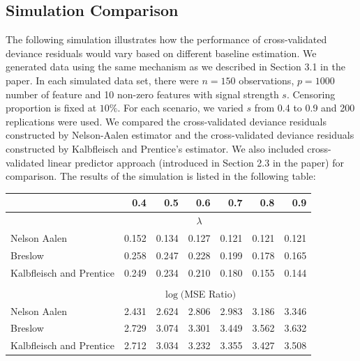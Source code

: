 \documentclass{article}
\begin{document}
\subsection{Simulation Comparison}
The following simulation illustrates how the performance of cross-validated deviance residuals would vary based on different baseline estimation. We generated data using the same mechanism as we described in Section 3.1 in the paper. In each simulated data set, there were $n = 150$ observations, $p = 1000$ number of feature and 10 non-zero features with signal strength $s$. Censoring proportion is fixed at $10\%$. For each scenario, we varied $s$ from 0.4 to 0.9 and 200 replications were used. We compared the cross-validated deviance residuals constructed by Nelson-Aalen estimator and the cross-validated deviance residuals constructed by Kalbfleisch and Prentice's estimator. We also included cross-validated linear predictor approach (introduced in Section 2.3 in the paper) for comparison. The results of the simulation is listed in the following table:

\begin{table}[h]
\centering
\begin{tabular}{lrrrrrr}
\toprule
  & 0.4 & 0.5 & 0.6 & 0.7 & 0.8 & 0.9\\
\midrule
\vspace{1mm}
 & \multicolumn{5}{c}{$\lambda$} & \\ 
\vspace{1mm}
Nelson Aalen & 0.152 & 0.134 & 0.127 & 0.121 & 0.121 & 0.121\\
Breslow & 0.258 & 0.247 & 0.228 & 0.199 & 0.178 & 0.165\\
Kalbfleisch and Prentice & 0.249 & 0.234 & 0.210 & 0.180 & 0.155 & 0.144\\
\vspace{0.5mm}\\
 & \multicolumn{5}{c}{$\log($MSE Ratio$)$} & \\ 
\vspace{1mm}
Nelson Aalen & 2.431 & 2.624 & 2.806 & 2.983 & 3.186 & 3.346 \\
Breslow & 2.729 & 3.074 & 3.301 & 3.449 & 3.562 & 3.632 \\
Kalbfleisch and Prentice & 2.712 & 3.034 & 3.232 & 3.355 & 3.427 & 3.508 \\
\bottomrule
\end{tabular}
\end{table}
\end{document}
